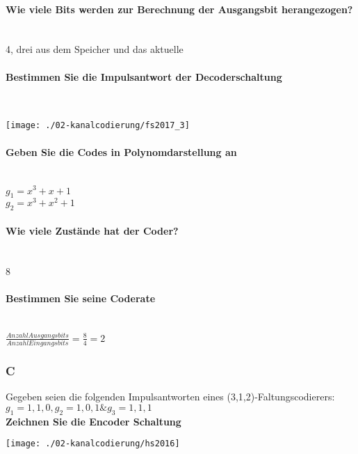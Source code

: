 \paragraph{Wie viele Bits werden zur Berechnung der Ausgangsbit herangezogen?}\mbox{}\\
4, drei aus dem Speicher und das aktuelle


\paragraph{Bestimmen Sie die Impulsantwort der Decoderschaltung}\mbox{}\\
\begin{center}
    \vspace{-8pt}
    \texttt{[image: ./02-kanalcodierung/fs2017\_3]}
    \vspace{-8pt}
\end{center}

\paragraph{Geben Sie die Codes in Polynomdarstellung an}\mbox{}\\
$g_1=x^3+x+1$\\
$g_2=x^3+x^2+1$

\paragraph{Wie viele Zustände hat der Coder?}\mbox{}\\
8

\paragraph{Bestimmen Sie seine Coderate}\mbox{}\\
$\frac{Anzahl Ausgangsbits}{Anzahl Eingangsbits} = \frac{8}{4}=2$\\

\columnbreak

\subsubsection{C}
Gegeben seien die folgenden Impulsantworten eines (3,1,2)-Faltungscodierers:\\
${g_1}={1,1,0}, {g_2}={1,0,1} \& {g_3}={1,1,1}$\\

\textbf{Zeichnen Sie die Encoder Schaltung}\\
\begin{center}
    \vspace{-8pt}
    \texttt{[image: ./02-kanalcodierung/hs2016]}
    \vspace{-8pt}
\end{center}

